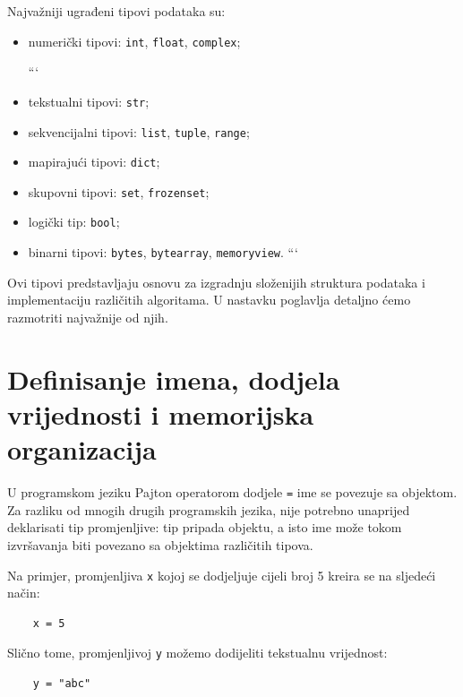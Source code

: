 Najvažniji ugrađeni tipovi podataka su:

\begin{itemize}
	\item numerički tipovi: \texttt{int}, \texttt{float}, \texttt{complex};
	
	```
	\item tekstualni tipovi: \texttt{str};
	
	\item sekvencijalni tipovi: \texttt{list}, \texttt{tuple}, \texttt{range};
	
	\item mapirajući tipovi: \texttt{dict};
	
	\item skupovni tipovi: \texttt{set}, \texttt{frozenset};
	
	\item logički tip: \texttt{bool};
	
	\item binarni tipovi: \texttt{bytes}, \texttt{bytearray}, \texttt{memoryview}.
	```
	
\end{itemize}

Ovi tipovi predstavljaju osnovu za izgradnju složenijih struktura podataka i implementaciju različitih algoritama. U nastavku poglavlja detaljno ćemo razmotriti najvažnije od njih.

\section[Imena i memorijska organizacija]{Definisanje imena, dodjela vrijednosti i memorijska organizacija}

U programskom jeziku Pajton operatorom dodjele \texttt{=} ime se povezuje sa objektom. Za razliku od mnogih drugih programskih jezika, nije potrebno unaprijed deklarisati tip promjenljive: tip pripada objektu, a isto ime može tokom izvršavanja biti povezano sa objektima različitih tipova.

Na primjer, promjenljiva \texttt{x} kojoj se dodjeljuje cijeli broj 5 kreira se na sljedeći način:

\begin{verbatim}
	x = 5
\end{verbatim}

Slično tome, promjenljivoj \texttt{y} možemo dodijeliti tekstualnu vrijednost:

\begin{verbatim}
	y = "abc"
\end{verbatim}

